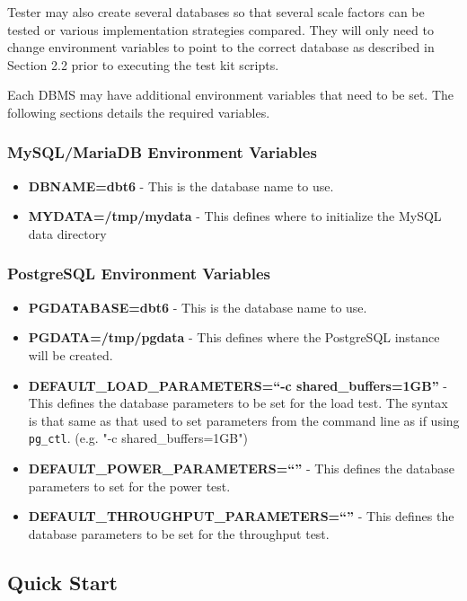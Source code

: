 \documentclass{article}
\begin{document}
Tester may also create several databases so that several scale factors can be
tested or various implementation strategies compared.  They will only need to
change environment variables to point to the correct database as described in
Section 2.2 prior to executing the test kit scripts.

Each DBMS may have additional environment variables that need to be set.  The
following sections details the required variables.

\subsubsection{MySQL/MariaDB Environment Variables}

\begin{itemize}
  \item \textbf{DBNAME=dbt6} - This is the database name to use.
  \item \textbf{MYDATA=/tmp/mydata} - This defines where to initialize the
        MySQL data directory
\end{itemize}

\subsubsection{PostgreSQL Environment Variables}

\begin{itemize}
  \item \textbf{PGDATABASE=dbt6} - This is the database name to use.
  \item \textbf{PGDATA=/tmp/pgdata} - This defines where the PostgreSQL
        instance will be created.
  \item \textbf{DEFAULT\_LOAD\_PARAMETERS=``-c shared\_buffers=1GB''} - This
        defines the database parameters to be set for the load test.  The
            syntax is that same as that used to set parameters from the command
                line as if using \texttt{pg\_ctl}. (e.g. "-c
                    shared\_buffers=1GB")
  \item \textbf{DEFAULT\_POWER\_PARAMETERS=``''} - This defines the database
        parameters to set for the power test.
  \item \textbf{DEFAULT\_THROUGHPUT\_PARAMETERS=``''} - This defines the
        database parameters to be set for the throughput test.
\end{itemize}

\subsection{Quick Start}
\end{document}
